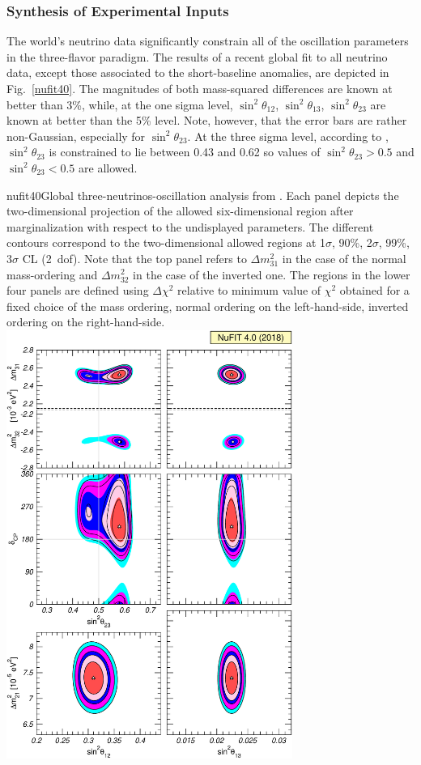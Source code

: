 \subsubsection{Synthesis of Experimental Inputs} 

The world's neutrino data significantly constrain all of the oscillation parameters in the three-flavor paradigm. The results of a recent global fit \cite{Esteban:2018azc} to all neutrino data, except those associated to the short-baseline anomalies, are depicted in Fig.~\ref{nufit40}. The magnitudes of both mass-squared differences are known at better than 3\%, while, at the one sigma level, $\sin^2\theta_{12}$, $\sin^2\theta_{13}$, $\sin^2\theta_{23}$ are known at better than the 5\% level. Note, however, that the error bars are rather non-Gaussian, especially for $\sin^2\theta_{23}$. At the three sigma level,  according to \cite{Esteban:2018azc}, $\sin^2\theta_{23}$ is constrained to lie between 0.43 and 0.62 so values of $\sin^2\theta_{23}>0.5$ and $\sin^2\theta_{23}<0.5$ are allowed.
\begin{dunefigure}{nufit40}{Global three-neutrinos-oscillation analysis from \cite{Esteban:2018azc}. Each panel depicts the two-dimensional projection of the allowed six-dimensional region after marginalization with respect to the undisplayed parameters. The different contours correspond to the two-dimensional allowed regions at 1$\sigma$, 90\%, 2$\sigma$, 99\%, 3$\sigma$ CL (2~dof). Note that the top panel refers to $\Delta m^2_{31}$ in the case of the normal mass-ordering and $\Delta m^2_{32}$ in the case of the inverted one. The regions in the lower four panels are defined using $\Delta \chi^2$ relative to minimum value of $\chi^2$ obtained for a fixed choice of the mass ordering, normal ordering on the left-hand-side, inverted ordering on the right-hand-side.
}
  \includegraphics[width=0.7\textwidth]{graphics/nufit40_global.pdf}
\end{dunefigure}

